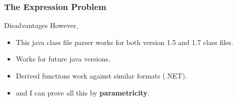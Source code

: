 \begin{frame}[fragile]
\frametitle{The Expression Problem}
\begin{block}{Disadvantages}
However,
\begin{itemize}
\item This java class file parser works for both version 1.5 and 1.7 class files.
\item Works for future java versions.
\item Derived functions work against similar formats (.NET).
\item and I can prove all this by \textbf{parametricity}.
\end{itemize}
\end{block}
\end{frame}
